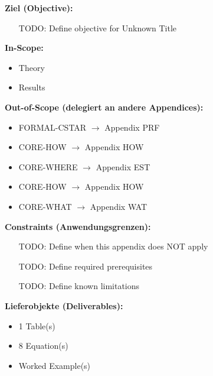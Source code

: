 

\begin{tcolorbox}[
    colback=orange!5!white,
    colframe=orange!75!black,
    title={\textbf{Appendix Scope: Ziel / In-Scope / Out-of-Scope / Constraints}},
    fonttitle=\bfseries
]

\textbf{Ziel (Objective):}
\begin{itemize}[nosep]
    \item [TODO: Define objective for Unknown Title]
\end{itemize}

\textbf{In-Scope:}
\begin{itemize}[nosep]
    \item Theory
    \item Results
\end{itemize}

\textbf{Out-of-Scope (delegiert an andere Appendices):}
\begin{itemize}[nosep]
    \item FORMAL-CSTAR $\rightarrow$ Appendix PRF
    \item CORE-HOW $\rightarrow$ Appendix HOW
    \item CORE-WHERE $\rightarrow$ Appendix EST
    \item CORE-HOW $\rightarrow$ Appendix HOW
    \item CORE-WHAT $\rightarrow$ Appendix WAT
\end{itemize}

\textbf{Constraints (Anwendungsgrenzen):}
\begin{itemize}[nosep]
    \item [TODO: Define when this appendix does NOT apply]
    \item [TODO: Define required prerequisites]
    \item [TODO: Define known limitations]
\end{itemize}

\textbf{Lieferobjekte (Deliverables):}
\begin{itemize}[nosep]
    \item 1 Table(s)
    \item 8 Equation(s)
    \item Worked Example(s)
\end{itemize}

\end{tcolorbox}



